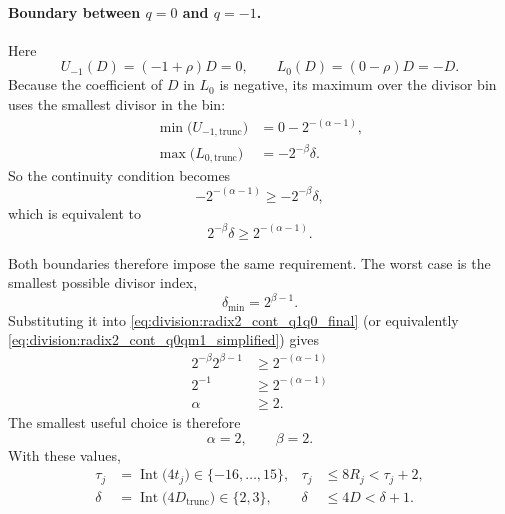 \documentclass[11pt]{article}
\DeclareMathOperator{\Int}{Int}
\numberwithin{equation}{section}
\begin{document}
\paragraph{Boundary between $q=0$ and $q=-1$.}
Here
\[
  U_{-1}(D) = (-1+\rho)D = 0,
  \qquad
  L_0(D) = (0-\rho)D = -D.
\]
Because the coefficient of $D$ in $L_0$ is negative, its maximum over the divisor bin uses the
smallest divisor in the bin:
\begin{align}
  \min\bigl(U_{-1,\text{trunc}}\bigr)
  &= 0 - 2^{-(\alpha-1)}, \nonumber \\
  \max\bigl(L_{0,\text{trunc}}\bigr)
  &= -2^{-\beta}\delta.
  \label{eq:division:radix2_cont_q0qm1}
\end{align}
So the continuity condition becomes
\begin{equation}
  \label{eq:division:radix2_cont_q0qm1_final}
  -2^{-(\alpha-1)} \ge -2^{-\beta}\delta,
\end{equation}
which is equivalent to
\begin{equation}
  \label{eq:division:radix2_cont_q0qm1_simplified}
  2^{-\beta}\delta \ge 2^{-(\alpha-1)}.
\end{equation}

Both boundaries therefore impose the same requirement.
The worst case is the smallest possible divisor index,
\[
  \delta_{\min} = 2^{\beta-1}.
\]
Substituting it into \cref{eq:division:radix2_cont_q1q0_final} (or equivalently
\cref{eq:division:radix2_cont_q0qm1_simplified}) gives
\begin{align}
  2^{-\beta}2^{\beta-1} &\ge 2^{-(\alpha-1)} \nonumber \\
  2^{-1} &\ge 2^{-(\alpha-1)} \nonumber \\
  \alpha &\ge 2.
  \label{eq:division:radix2_alpha_ge_2}
\end{align}
The smallest useful choice is therefore
\begin{equation}
  \label{eq:division:radix2_alpha_beta_choice}
  \alpha = 2,
  \qquad
  \beta = 2.
\end{equation}
With these values,
\begin{align}
  \label{eq:division:radix2_tau_val}
  \tau_j &= \Int\bigl(4t_j\bigr) \in \{-16,\dotsc,15\},
  &
  \tau_j &\le 8R_j < \tau_j+2, \\
  \label{eq:division:radix2_delta_val}
  \delta &= \Int\bigl(4D_{\text{trunc}}\bigr) \in \{2,3\},
  &
  \delta &\le 4D < \delta+1.
\end{align}
\end{document}
